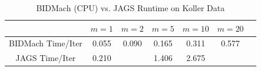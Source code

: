 \documentclass{article} %
\begin{document}
%
%
%
%
%
%
%
%
\begin{table}[t]
\caption{BIDMach (CPU) vs. JAGS Runtime on Koller Data}
\label{tab:bidmach_jags_koller}
\begin{center}
\begin{tabular}{ |c|c|c|c|c|c|c| } 
\hline
                  & $m=1$ & $m=2$ & $m=5$ & $m=10$ & $m=20$ \\
\hline \hline
BIDMach Time/Iter & 0.055 & 0.090 & 0.165 & 0.311  & 0.577 \\ 
JAGS Time/Iter    & 0.210 &  & 1.406 & 2.675 & \\
\hline
\end{tabular}
\end{center}
\end{table}
\end{document}
